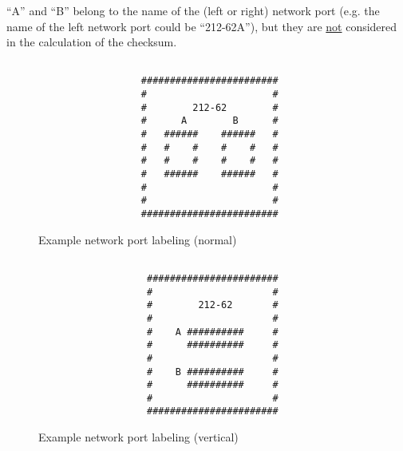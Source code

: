 ``A'' and ``B'' belong to the name of the (left or right) network port (e.g. the
name of the left network port could be ``212-62A''), but they are \underline{not}
considered in the calculation of the checksum.


\begin{minipage}[t]{.42\textwidth}
	\begin{figure}[H]
		\begin{verbatim}

			      ########################
			      #                      #
			      #        212-62        #
			      #      A        B      #
			      #   ######    ######   #
			      #   #    #    #    #   #
			      #   #    #    #    #   #
			      #   ######    ######   #
			      #                      #
			      #                      #
			      ########################
		\end{verbatim}

		\caption{Example network port labeling (normal)}
	\end{figure}
\end{minipage}
\hfill
\begin{minipage}[t]{.42\textwidth}
	\begin{figure}[H]
		\begin{verbatim}

			       #######################
			       #                     #
			       #        212-62       #
			       #                     #
			       #    A ##########     #
			       #      ##########     #
			       #                     #
			       #    B ##########     #
			       #      ##########     #
			       #                     #
			       #######################
		\end{verbatim}

		\caption{Example network port labeling (vertical)}
	\end{figure}
\end{minipage} \\
